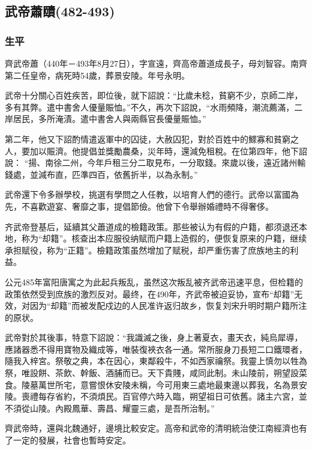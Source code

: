 
\subsection{武帝蕭賾\tiny(482-493)}

\subsubsection{生平}

齊武帝蕭（440年－493年8月27日），字宣遠，齊高帝蕭道成長子，母刘智容。南齊第二任皇帝，病死時54歲，葬景安陵。年号永明。

武帝十分關心百姓疾苦，即位後，就下詔說：“比歲未稔，貧窮不少，京師二岸，多有其弊。遣中書舍人優量賑恤。”不久，再次下詔說，“水雨頻降，潮流薦滿，二岸居民，多所淹漬。遣中書舍人與兩縣官長優量賑恤。”

第二年，他又下詔酌情遣返軍中的囚徒，大赦囚犯，對於百姓中的鰥寡和貧窮之人，要加以賑濟。他提倡並獎勵農桑，災年時，還減免租稅。在位第四年，他下詔說： “揚、南徐二州，今年戶租三分二取見布，一分取錢。來歲以後，遠近諸州輸錢處，並減布直，匹準四百，依舊折半，以為永制。”

武帝還下令多辦學校，挑選有學問之人任教，以培育人們的德行。武帝以富國為先，不喜歡遊宴、奢靡之事，提倡節儉。他曾下令舉辦婚禮時不得奢侈。

齐武帝登基后，延續其父蕭道成的檢籍政策。那些被认为有假的户籍，都须退还本地，称为“却籍”。核查出本应服役纳赋而户籍上造假的，便恢复原来的户籍，继续承担赋役，称为“正籍”。檢籍政策虽然增加了赋税，却严重伤害了庶族地主的利益。

公元485年富阳唐寓之为此起兵叛乱，虽然这次叛乱被齐武帝迅速平息，但检籍的政策依然受到庶族的激烈反对。最终，在490年，齐武帝被迫妥协，宣布“却籍”无效，对因为“却籍”而被发配戍边的人民准许返归故乡，恢复刘宋升明时期户籍所注的原状。

武帝對於其後事，特意下詔說：“我識滅之後，身上著夏衣，畫天衣，純烏犀導，應諸器悉不得用寶物及織成等，唯裝復裌衣各一通。常所服身刀長短二口鐵環者，隨我入梓宮。祭敬之典，本在因心，東鄰殺牛，不如西家禴祭。我靈上慎勿以牲為祭，唯設餅、茶飲、幹飯、酒脯而已。天下貴賤，咸同此制。未山陵前，朔望設菜食。陵墓萬世所宅，意嘗恨休安陵未稱，今可用東三處地最東邊以葬我，名為景安陵。喪禮每存省約，不須煩民。百官停六時入臨，朔望祖日可依舊。諸主六宮，並不須從山陵。內殿鳳華、壽昌、耀靈三處，是吾所治制。”

齊武帝時，還與北魏通好，邊境比較安定。高帝和武帝的清明統治使江南經濟也有了一定的發展，社會也暫時安定。


